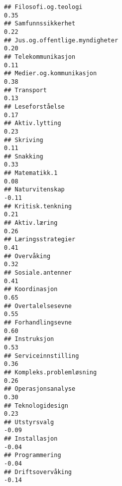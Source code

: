 \documentclass[
]{article}
\begin{document}
\begin{verbatim}
## Filosofi.og.teologi                                                               0.35
## Samfunnssikkerhet                                                                 0.22
## Jus.og.offentlige.myndigheter                                                     0.20
## Telekommunikasjon                                                                 0.11
## Medier.og.kommunikasjon                                                           0.38
## Transport                                                                         0.13
## Leseforståelse                                                                    0.17
## Aktiv.lytting                                                                     0.23
## Skriving                                                                          0.11
## Snakking                                                                          0.33
## Matematikk.1                                                                      0.08
## Naturvitenskap                                                                   -0.11
## Kritisk.tenkning                                                                  0.21
## Aktiv.læring                                                                      0.26
## Læringsstrategier                                                                 0.41
## Overvåking                                                                        0.32
## Sosiale.antenner                                                                  0.41
## Koordinasjon                                                                      0.65
## Overtalelsesevne                                                                  0.55
## Forhandlingsevne                                                                  0.60
## Instruksjon                                                                       0.53
## Serviceinnstilling                                                                0.36
## Kompleks.problemløsning                                                           0.26
## Operasjonsanalyse                                                                 0.30
## Teknologidesign                                                                   0.23
## Utstyrsvalg                                                                      -0.09
## Installasjon                                                                     -0.04
## Programmering                                                                    -0.04
## Driftsovervåking                                                                 -0.14

\end{verbatim}
\end{document}
